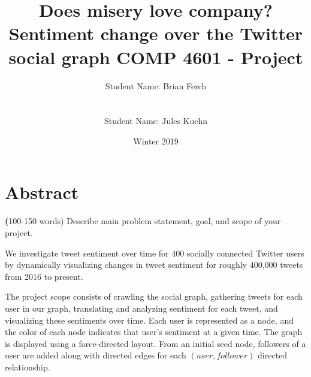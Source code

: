 \documentclass[12pt]{article}
\begin{document}
\title {
    Does misery love company?\\
    Sentiment change over the Twitter social graph\newline\newline
    \large COMP 4601 - Project}
\author{Student Name: Brian Ferch\\
\\\\ 
Student Name: Jules Kuehn\\
}
\date{Winter 2019}
\maketitle


% 



\section{Abstract}
\textbf (100-150 words) Describe main problem statement, goal, and scope of your project.\newline

We investigate tweet sentiment over time for 400 socially connected Twitter users by dynamically visualizing changes in tweet sentiment for roughly 400,000 tweets from 2016 to present.\newline

The project scope consists of crawling the social graph, gathering tweets for each user in our graph, translating and analyzing sentiment for each tweet, and visualizing these sentiments over time. Each user is represented as a node, and the color of each node indicates that user’s sentiment at a given time. The graph is displayed using a force-directed layout. From an initial seed node, followers of a user are added along with directed edges for each $(user, follower)$ directed relationship.
\end{document}
